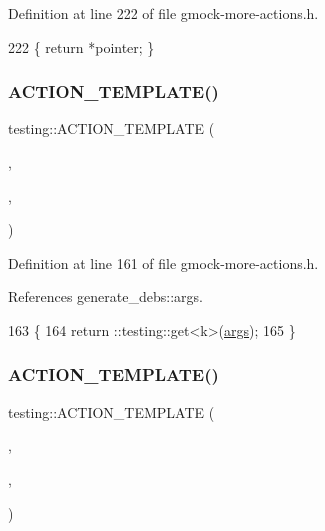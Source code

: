 Definition at line 222 of file gmock-\/more-\/actions.\+h.


\begin{DoxyCode}
222 \{ \textcolor{keywordflow}{return} *pointer; \}
\end{DoxyCode}
\mbox{\label{namespacetesting_a109d48f969260878ed1e743006196992}} 
\subsubsection{\texorpdfstring{A\+C\+T\+I\+O\+N\+\_\+\+T\+E\+M\+P\+L\+A\+T\+E()}{ACTION\_TEMPLATE()}\hspace{0.1cm}{\footnotesize\ttfamily [1/28]}}
{\footnotesize\ttfamily testing\+::\+A\+C\+T\+I\+O\+N\+\_\+\+T\+E\+M\+P\+L\+A\+TE (\begin{DoxyParamCaption}\item[{Return\+Arg}]{,  }\item[{H\+A\+S\+\_\+1\+\_\+\+T\+E\+M\+P\+L\+A\+T\+E\+\_\+\+P\+A\+R\+A\+MS(int, k)}]{,  }\item[{A\+N\+D\+\_\+0\+\_\+\+V\+A\+L\+U\+E\+\_\+\+P\+A\+R\+A\+MS()}]{ }\end{DoxyParamCaption})}



Definition at line 161 of file gmock-\/more-\/actions.\+h.



References generate\+\_\+debs\+::args.


\begin{DoxyCode}
163                                       \{
164   return ::testing::get<k>(\hyperlink{namespacegenerate__debs_a75f9143e38df82d83b2e8a6f99cae02c}{args});
165 \}
\end{DoxyCode}
\mbox{\label{namespacetesting_a0478a3464d31f6726d5bc47b1be46491}} 
\subsubsection{\texorpdfstring{A\+C\+T\+I\+O\+N\+\_\+\+T\+E\+M\+P\+L\+A\+T\+E()}{ACTION\_TEMPLATE()}\hspace{0.1cm}{\footnotesize\ttfamily [2/28]}}
{\footnotesize\ttfamily testing\+::\+A\+C\+T\+I\+O\+N\+\_\+\+T\+E\+M\+P\+L\+A\+TE (\begin{DoxyParamCaption}\item[{Save\+Arg}]{,  }\item[{H\+A\+S\+\_\+1\+\_\+\+T\+E\+M\+P\+L\+A\+T\+E\+\_\+\+P\+A\+R\+A\+MS(int, k)}]{,  }\item[{A\+N\+D\+\_\+1\+\_\+\+V\+A\+L\+U\+E\+\_\+\+P\+A\+R\+A\+MS(pointer)}]{ }\end{DoxyParamCaption})}



